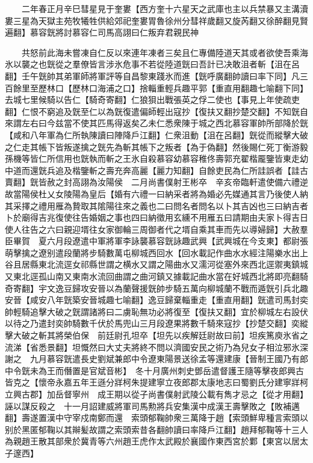 　　二年春正月辛巳彗星見于奎婁【西方奎十六星天之武庫也主以兵禁暴又主溝瀆婁三星為天獄主苑牧犧牲供給郊祀奎婁胃魯徐州分彗祥歲翻又旋芮翻又徐醉翻見賢遍翻】慕容皝將討慕容仁司馬高詡曰仁叛弃君親民神

　　共怒前此海未嘗凍自仁反以來連年凍者三矣且仁專備陸道天其或者欲使吾乘海氷以襲之也皝從之羣僚皆言涉氷危事不若從陸道皝曰吾計已决敢沮者斬【沮在呂翻】壬午皝帥其弟軍師將軍評等自昌黎東踐氷而進【皝呼廣翻帥讀曰率下同】凡三百餘里至歷林口【歷林口海浦之口】捨輜重輕兵趣平郭【重直用翻趣七喻翻下同】去城七里候騎以告仁【騎奇寄翻】仁狼狽出戰張英之俘二使也【事見上年使疏吏翻】仁恨不窮追及皝至仁以為皝復遣偏師輕出寇抄【復扶又翻抄楚交翻】不知皝自來謂左右曰今兹當不使其匹馬得返矣乙未仁悉衆陳于城之西北慕容軍帥所部降於皝【咸和八年軍為仁所執陳讀曰陣降戶江翻】仁衆沮動【沮在呂翻】皝從而縱擊大破之仁走其帳下皆叛遂擒之皝先為斬其帳下之叛者【為于偽翻】然後賜仁死丁衡游毅孫機等皆仁所信用也皝執而斬之王氷自殺慕容幼慕容稚佟壽郭充翟楷龎鑒皆東走幼中道而還皝兵追及楷鑒斬之壽充奔高麗【麗力知翻】自餘吏民為仁所詿誤者【詿古賣翻】皝皆赦之封高詡為汝陽侯　二月尚書僕射王彬卒　辛亥帝臨軒遣使備六禮逆故當陽侯杜乂女陵陽為皇后【婚有六禮一曰納采者將為婚必先媒通其言乃後使人納其采擇之禮用雁為贄取其隂陽往來之義也二曰問名者問名以卜其吉凶也三曰納吉者卜於廟得吉兆復使往告婚姻之事也四曰納徵用玄纁不用雁五曰請期由夫家卜得吉日使人往告之六曰親迎壻往女家御輪三周御者代之壻自乘其車而先以導婦歸】大赦羣臣畢賀　夏六月段遼遣中軍將軍李詠襲慕容皝詠趣武興【武興城在今支東】都尉張萌擊擒之遼别遣段蘭將步騎數萬屯柳城西回水【回水載記作曲水水經注陽樂水出上谷且居縣東北流逕女祁縣世謂之横水又謂之陽曲水又濡河從塞外來西北逕禦夷鎮城又東北逕孤山南又東南水流回曲謂之曲河鎮又據載記曲水當在好城西北將即亮翻騎奇寄翻】宇文逸豆歸攻安晉以為蘭聲援皝帥步騎五萬向柳城蘭不戰而遁皝引兵北趣安晉【咸安八年皝築安晉城趣七喻翻】逸豆歸棄輜重走【重直用翻】皝遣司馬封奕帥輕騎追擊大破之皝謂諸將曰二虜恥無功必將復至【復扶又翻】宜於柳城左右設伏以待之乃遣封奕帥騎數千伏於馬兜山三月段遼果將數千騎來寇抄【抄楚交翻】奕縱擊大破之斬其將榮伯保　前廷尉孔坦卒【坦先以疾解廷尉故曰前】坦疾篤庾氷省之流涕【省悉景翻】坦慨然曰大丈夫將終不問以濟國安民之術乃為兒女子相泣邪氷深謝之　九月慕容皝遣長史劉斌兼郎中令遼東陽景送徐孟等還建康【晉制王國乃有郎中令皝未為王而僭置是官斌音彬】　冬十月廣州刺史鄧岳遣督護王隨等擊夜郎興古皆克之【懷帝永嘉五年王遜分牂柯朱提建寧立夜郎郡太康地志曰蜀劉氏分建寧牂柯立興古郡】加岳督寧州　成王期以從子尚書僕射武陵公載有雋才忌之【從才用翻】誣以謀反殺之　十一月詔建威將軍司馬勲將兵安集漢中成漢王壽擊敗之【敗補邁翻】壽遂置漢中守宰戍南鄭而還　索頭郁鞠帥衆三萬降于趙【索頭鮮卑種言索頭以别於黑匿郁鞠以其辮髪故謂之索頭索昔各翻帥讀曰率降戶江翻】趙拜郁鞠等十三人為親趙王散其部衆於冀青等六州趙王虎作太武殿於襄國作東西宮於鄴【東宮以居太子邃西】

